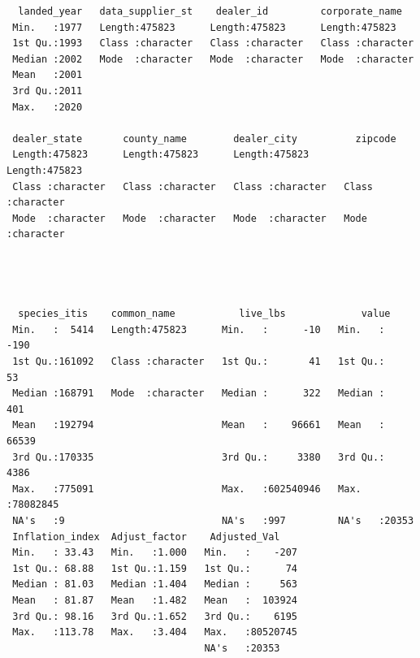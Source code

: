 \documentclass[
  letterpaper,
  DIV=11,
  numbers=noendperiod]{scrartcl}
\newenvironment{Shaded}{\begin{snugshade}}{\end{snugshade}}
\newcommand{\AttributeTok}[1]{\textcolor[rgb]{0.40,0.45,0.13}{#1}}
\newcommand{\CommentTok}[1]{\textcolor[rgb]{0.37,0.37,0.37}{#1}}
\newcommand{\FunctionTok}[1]{\textcolor[rgb]{0.28,0.35,0.67}{#1}}
\newcommand{\NormalTok}[1]{\textcolor[rgb]{0.00,0.23,0.31}{#1}}
\newcommand{\SpecialCharTok}[1]{\textcolor[rgb]{0.37,0.37,0.37}{#1}}
\newcommand{\StringTok}[1]{\textcolor[rgb]{0.13,0.47,0.30}{#1}}
\begin{document}
\begin{verbatim}
  landed_year   data_supplier_st    dealer_id         corporate_name    
 Min.   :1977   Length:475823      Length:475823      Length:475823     
 1st Qu.:1993   Class :character   Class :character   Class :character  
 Median :2002   Mode  :character   Mode  :character   Mode  :character  
 Mean   :2001                                                           
 3rd Qu.:2011                                                           
 Max.   :2020                                                           
                                                                        
 dealer_state       county_name        dealer_city          zipcode         
 Length:475823      Length:475823      Length:475823      Length:475823     
 Class :character   Class :character   Class :character   Class :character  
 Mode  :character   Mode  :character   Mode  :character   Mode  :character  
                                                                            
                                                                            
                                                                            
                                                                            
  species_itis    common_name           live_lbs             value         
 Min.   :  5414   Length:475823      Min.   :      -10   Min.   :    -190  
 1st Qu.:161092   Class :character   1st Qu.:       41   1st Qu.:      53  
 Median :168791   Mode  :character   Median :      322   Median :     401  
 Mean   :192794                      Mean   :    96661   Mean   :   66539  
 3rd Qu.:170335                      3rd Qu.:     3380   3rd Qu.:    4386  
 Max.   :775091                      Max.   :602540946   Max.   :78082845  
 NA's   :9                           NA's   :997         NA's   :20353     
 Inflation_index  Adjust_factor    Adjusted_Val     
 Min.   : 33.43   Min.   :1.000   Min.   :    -207  
 1st Qu.: 68.88   1st Qu.:1.159   1st Qu.:      74  
 Median : 81.03   Median :1.404   Median :     563  
 Mean   : 81.87   Mean   :1.482   Mean   :  103924  
 3rd Qu.: 98.16   3rd Qu.:1.652   3rd Qu.:    6195  
 Max.   :113.78   Max.   :3.404   Max.   :80520745  
                                  NA's   :20353     
\end{verbatim}

\begin{Shaded}
\end{Shaded}
\end{document}
